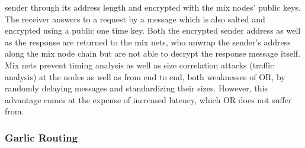 \documentclass{sig-alternate}
\begin{document}
sender through its address length and encrypted with the mix nodes' public keys. The receiver answers to a request by a message which is also salted and encrypted using a public one time key. Both the encrypted sender address as well as the response are returned to the mix nets, who unwrap the sender's address along the mix node chain but are not able to decrypt the response message itself. Mix nets prevent timing analysis as well as size correlation attacks (traffic analysis) at the nodes as well as from end to end, both weaknesses of OR, by randomly delaying messages and standardizing their sizes. However, this advantage comes at the expense of increased latency, which OR does not suffer from. 

\subsubsection {Garlic Routing}
\end{document}
